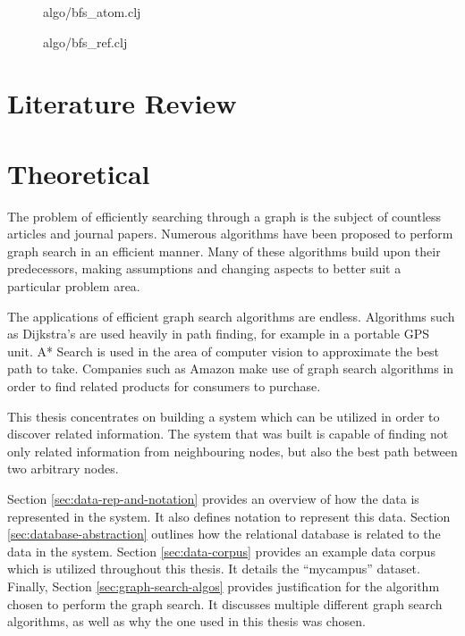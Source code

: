 \documentclass[12pt,letterpaper,oneside,notitlepage]{report}
\theoremstyle{definition}
\begin{document}
		\begin{figure}[ht!]
			
			\caption{algo/bfs\_atom.clj}
		\end{figure}
		
		\begin{figure}[ht!]
			
			\caption{algo/bfs\_ref.clj}
		\end{figure}

	\chapter{Literature Review}
	
	\chapter{Theoretical}
		The problem of efficiently searching through a graph is the subject of countless articles and journal papers.  Numerous algorithms have been proposed to perform graph search in an efficient manner.  Many of these algorithms build upon their predecessors, making assumptions and changing aspects to better suit a particular problem area.
		
		The applications of efficient graph search algorithms are endless.  Algorithms such as Dijkstra's are used heavily in path finding, for example in a portable GPS unit.  A* Search is used in the area of computer vision to approximate the best path to take.  Companies such as Amazon make use of graph search algorithms in order to find related products for consumers to purchase.
		
		This thesis concentrates on building a system which can be utilized in order to discover related information.  The system that was built is capable of finding not only related information from neighbouring nodes, but also the best path between two arbitrary nodes.
		
		Section \ref{sec:data-rep-and-notation} provides an overview of how the data is represented in the system.  It also defines notation to represent this data.  Section \ref{sec:database-abstraction} outlines how the relational database is related to the data in the system.  Section \ref{sec:data-corpus} provides an example data corpus which is utilized throughout this thesis.  It details the ``mycampus'' dataset.  Finally, Section \ref{sec:graph-search-algos} provides justification for the algorithm chosen to perform the graph search.  It discusses multiple different graph search algorithms, as well as why the one used in this thesis was chosen.
		
\end{document}

